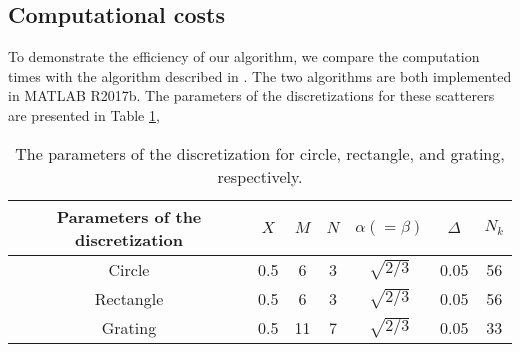 \documentclass[preprint,12pt]{elsarticle}
\begin{document}
\subsection{Computational costs}
 To demonstrate the efficiency of our algorithm, we compare the computation times with the algorithm described in \cite{Dilz2016The}. The two algorithms  are both implemented {in} MATLAB R2017b. The parameters of the discretizations for these scatterers are presented in {Table \ref{discretization_parameters}},
 \begin{small}
 \begin{table} [!h]
 \centering
 \begin{tabular}{|c|c|c|c|c|c|c|}
 \hline
 Parameters of the discretization &$X$ & $M$ &$N$  & $\alpha (=\beta)$ & $\Delta$ & $N_k$ \\\hline
  Circle &0.5& 6 & 3 & $\sqrt{2/3}$ & 0.05 & 56 \\\hline
  Rectangle &0.5& 6 & 3 & $\sqrt{2/3}$ & 0.05 & 56\\\hline
   Grating  & 0.5 & 11 & 7 & $\sqrt{2/3}$ & 0.05 & 33  \\\hline
 \end{tabular}
 \caption{The parameters of the discretization for circle, rectangle, and grating, respectively.}
 \label{discretization_parameters}
 \end{table}
 \end{small}

 
\end{document}
